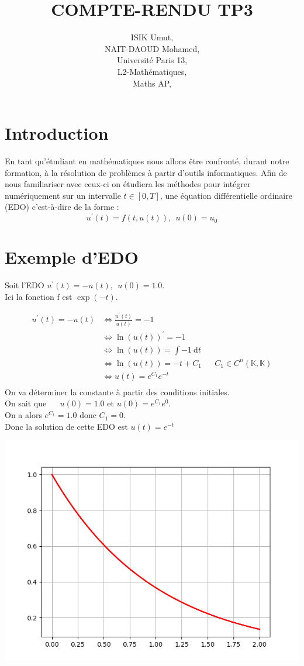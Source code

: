 \documentclass{article}
\title{COMPTE-RENDU TP3}
\author{ISIK Umut,\\ NAIT-DAOUD Mohamed,\\ Université Paris 13,\\ L2-Mathématiques,\\ Maths AP,}
\begin{document}
\maketitle

\section{Introduction}

En tant qu'étudiant en mathématiques nous allons être confronté, durant notre formation, à la résolution de problèmes à partir d'outils informatiques. Afin de nous familiariser avec ceux-ci on étudiera les méthodes pour intégrer numériquement sur un intervalle $ t \in [0,T] $, une équation différentielle ordinaire (EDO) c'est-à-dire de la forme : $$ u^{'}(t)=f(t,u(t)), ~~ u(0)=u_{0} $$

\section{Exemple d'EDO}

Soit l'EDO $ u^{'}(t) = -u(t), ~~ u(0)=1.0 $.\\
Ici la fonction f est $\exp(-t)$.

\begin{align*}
u^{'}(t)= -u(t) &\iff \frac{u^{'}(t)}{u(t)} = -1 \\
				&\iff \ln(u(t))^{'} = -1 \\
				&\iff \ln(u(t)) = \int -1 ~\mathrm{d}t \\
				&\iff \ln(u(t)) = -t+C_1 && C_1 \in C^{n}(\mathbb{K},\mathbb{K}) \\
				&\iff u(t) = e^{C_1}e^{-t} \\
\end{align*}
On va déterminer la constante à partir des conditions initiales.\\ On sait que ~~ $u(0)=1.0$ et $u(0)=e^{C_1}e^{0}$.\\
On a alors $e^{C_1}=1.0$ donc $C_1=0$.\\
Donc la solution de cette EDO est $u(t)=e^{-t}$
\begin{center}
\includegraphics[scale=0.5]{fig1.png}
\end{center}
\end{document}
